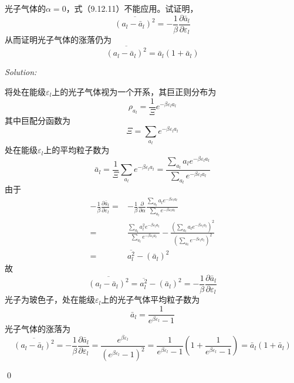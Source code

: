 \documentclass[12pt,a4paper]{article}
\newenvironment{problem}[2][Problem]{\begin{trivlist}
\item[\hskip \labelsep {\bfseries #1}\hskip \labelsep {\bfseries #2.}]}{\end{trivlist}}
\newenvironment{sol}
    {\emph{Solution:}
    }
    {
    \qed
    }
\begin{document}
\begin{problem}{9.22}
光子气体的$\alpha=0$，式（9.12.11）不能应用。试证明，
\[
\overline{(a_l-\bar{a}_l)^2}=-\frac{1}{\beta}\frac{\partial\bar{a}_l}{\partial\varepsilon_l}
\]
从而证明光子气体的涨落仍为
\[
\overline{(a_l-\bar{a}_l)^2}=\bar{a}_l(1+\bar{a}_l)
\]
\end{problem}
\begin{sol}
将处在能级$\varepsilon_l$上的光子气体视为一个开系，其巨正则分布为
\begin{equation}
\rho_{a_l}=\frac{1}{\Xi}e^{-\beta\varepsilon_la_l}
\end{equation}
其中巨配分函数为
\begin{equation}
\Xi=\sum_{a_l}e^{-\beta\varepsilon_la_l}
\end{equation}
处在能级$\varepsilon_l$上的平均粒子数为
\begin{equation}
\bar{a}_l=\frac{1}{\Xi}\sum_{a_l}e^{-\beta\varepsilon_la_l}=\frac{\sum_{a_l}a_le^{-\beta\varepsilon_la_l}}{\sum_{a_l}e^{-\beta\varepsilon_la_l}}
\end{equation}
由于
\begin{align}
\nonumber-\frac{1}{\beta}\frac{\partial\bar{a}_l}{\partial\varepsilon_l}=&-\frac{1}{\beta}\frac{\partial}{\partial\alpha}\frac{\sum_{a_l}a_le^{-\beta\varepsilon_la_l}}{\sum_{a_l}e^{-\beta\varepsilon_la_l}}\\
\nonumber=&\frac{\sum_{a_l}a_l^2e^{-\beta\varepsilon_la_l}}{\sum_{a_l}e^{-\beta\varepsilon_la_l}}-\frac{\left(\sum_{a_l}a_le^{-\beta\varepsilon_la_l}\right)^2}{\left(\sum_{a_l}e^{-\beta\varepsilon_la_l}\right)^2}\\
=&\overline{a_l^2}-(\bar{a}_l)^2
\end{align}
故
\begin{equation}
\overline{(a_l-\bar{a}_l)^2}=\overline{a_l^2}-(\bar{a}_l)^2=-\frac{1}{\beta}\frac{\partial\bar{a}_l}{\partial\varepsilon_l}
\end{equation}
光子为玻色子，处在能级$\varepsilon_l$上的光子气体平均粒子数为
\begin{equation}
\bar{a}_l=\frac{1}{e^{\beta\varepsilon_l}-1}
\end{equation}
光子气体的涨落为
\begin{equation}
\overline{(a_l-\bar{a}_l)^2}=-\frac{1}{\beta}\frac{\partial\bar{a}_l}{\partial\varepsilon_l}=\frac{e^{\beta\varepsilon_l}}{(e^{\beta\varepsilon_l}-1)^2}=\frac{1}{e^{\beta\varepsilon_l}-1}(1+\frac{1}{e^{\beta\varepsilon_l}-1})=\bar{a}_l(1+\bar{a}_l)
\end{equation}
\end{sol}
\end{document}
